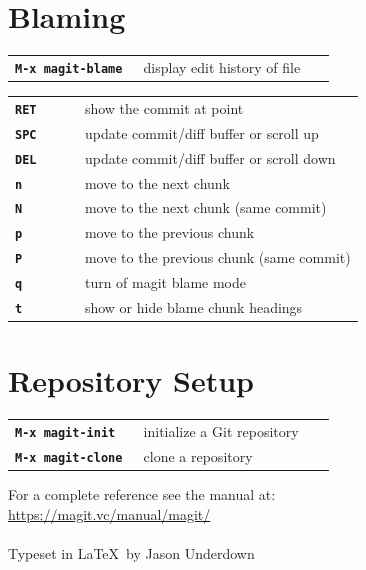 \documentclass[9pt]{extarticle} %
\begin{document}
\begin{multicols}{3}

  \section*{Blaming}

  \begin{tabular}{L{0.40\linewidth} L{0.60\linewidth}}
    \tt \textbf{M-x magit-blame} & display edit history of file
  \end{tabular}
  \begin{tabular}{L{0.20\linewidth} L{0.80\linewidth}}
    \tt \textbf{RET} & show the commit at point \\
    \tt \textbf{SPC} & update commit/diff buffer or scroll up \\
    \tt \textbf{DEL} & update commit/diff buffer or scroll down \\
    \tt \textbf{n} & move to the next chunk \\
    \tt \textbf{N} & move to the next chunk (same commit) \\
    \tt \textbf{p} & move to the previous chunk \\
    \tt \textbf{P} & move to the previous chunk (same commit) \\
    \tt \textbf{q} & turn of magit blame mode \\
    \tt \textbf{t} & show or hide blame chunk headings
  \end{tabular}


  \section*{Repository Setup}

  \begin{tabular}{L{0.40\linewidth} L{0.60\linewidth}}
    \tt \textbf{M-x magit-init} & initialize a Git repository \\
    \tt \textbf{M-x magit-clone} & clone a repository
  \end{tabular}

  \vspace{3ex}

  For a complete reference see the manual at: \\
  \url{https://magit.vc/manual/magit/} \\ \\
  Typeset in \LaTeX{}\ by Jason Underdown

\end{multicols}
\end{document}
